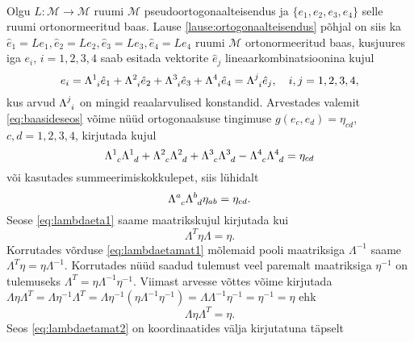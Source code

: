 \documentclass[a4paper,12pt]{article}
\theoremstyle{plain}
\theoremstyle{definition}
\numberwithin{equation}{section}
\begin{document}
\paragraph{} Olgu $L : \mathcal{M} \rightarrow \mathcal{M}$ ruumi $\mathcal{M}$ pseudoortogonaalteisendus ja $\{e_1, e_2, e_3, e_4\}$ selle ruumi ortonormeeritud baas. Lause \ref{lause:ortogonaalteisendus} põhjal on siis ka $\hat{e}_1 = Le_1, \hat{e}_2  = Le_2, \hat{e}_3 = Le_3, \hat{e}_4 = Le_4$ ruumi $\mathcal{M}$ ortonormeeritud baas, kusjuures iga $e_i$, $i = 1,2,3,4$ saab esitada vektorite $\hat{e}_j$ lineaarkombinatsioonina kujul
\begin{equation} \label{eq:baasideseos}
e_i = \Lambda\indices{^1_i} \hat{e}_1 + \Lambda\indices{^2_i} \hat{e}_2 + \Lambda\indices{^3_i} \hat{e}_3 + \Lambda\indices{^4_i} \hat{e}_4 = \Lambda\indices{^j_i} \hat{e}_j, \quad i,j = 1, 2, 3, 4,
\end{equation}
kus arvud $\Lambda\indices{^j_i}$ on mingid reaalarvulised konstandid. Arvestades valemit \ref{eq:baasideseos} võime nüüd ortogonaalsuse tingimuse $g \left(e_c, e_d\right) = \eta_{cd}$, $c, d = 1, 2, 3, 4$, kirjutada kujul
\begin{equation*}
\Lambda\indices{^1_c} \Lambda\indices{^1_d} + \Lambda\indices{^2_c} \Lambda\indices{^2_d} + \Lambda\indices{^3_c} \Lambda\indices{^3_d} - \Lambda\indices{^4_c} \Lambda\indices{^4_d} = \eta_{cd}
\end{equation*}
või kasutades summeerimiskokkulepet, siis lühidalt
\begin{equation} \label{eq:lambdaeta1}
\Lambda\indices{^a_c} \Lambda\indices{^b_d} \eta_{ab} = \eta_{cd}.
\end{equation}
Seose \ref{eq:lambdaeta1} saame maatrikskujul kirjutada kui
\begin{equation} \label{eq:lambdaetamat1}
\Lambda^T \eta \Lambda = \eta.
\end{equation}
Korrutades võrduse \ref{eq:lambdaetamat1} mõlemaid pooli maatriksiga $\Lambda^{-1}$ saame $\Lambda^T \eta = \eta \Lambda^{-1}$. Korrutades nüüd saadud tulemust veel paremalt maatriksiga $\eta^{-1}$ on tulemuseks $\Lambda^T = \eta \Lambda^{-1} \eta^{-1}$. Viimast arvesse võttes võime kirjutada $\Lambda \eta \Lambda^T = \Lambda \eta^{-1} \Lambda^T = \Lambda \eta^{-1} \left( \eta \Lambda^{-1} \eta^{-1} \right) = \Lambda \Lambda^{-1} \eta^{-1} = \eta^{-1} = \eta$ ehk
\begin{equation} \label{eq:lambdaetamat2}
\Lambda \eta \Lambda^T = \eta.
\end{equation}
Seos \ref{eq:lambdaetamat2} on koordinaatides välja kirjutatuna täpselt
\end{document}
